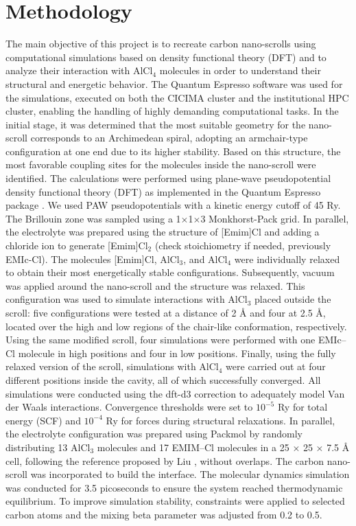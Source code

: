 \documentclass[aps,twocolumn,secnumarabic,nobalancelastpage,amsmath,amssymb,
nofootinbib,floatfix]{revtex4}
\begin{document}
\section{Methodology}
The main objective of this project is to recreate carbon nano-scrolls using computational simulations based on density functional theory (DFT) and to analyze their interaction with AlCl$_4$ molecules in order to understand their structural and energetic behavior. The Quantum Espresso software was used for the simulations, executed on both the CICIMA cluster and the institutional HPC cluster, enabling the handling of highly demanding computational tasks.
In the initial stage, it was determined that the most suitable geometry for the nano-scroll corresponds to an Archimedean spiral, adopting an armchair-type configuration at one end due to its higher stability. Based on this structure, the most favorable coupling sites for the molecules inside the nano-scroll were identified. The calculations were performed using plane-wave pseudopotential density functional theory (DFT) as implemented in the Quantum Espresso package \cite{qe}. We used PAW pseudopotentials with a kinetic energy cutoff of 45 Ry. The Brillouin zone was sampled using a 1$\times$1$\times$3 Monkhorst-Pack grid.
In parallel, the electrolyte was prepared using the structure of [Emim]Cl and adding a chloride ion to generate [Emim]Cl$_2$ (check stoichiometry if needed, previously EMIc-Cl). The molecules [Emim]Cl, AlCl$_3$, and AlCl$_4$ were individually relaxed to obtain their most energetically stable configurations.
Subsequently, vacuum was applied around the nano-scroll and the structure was relaxed. This configuration was used to simulate interactions with AlCl$_3$ placed outside the scroll: five configurations were tested at a distance of 2 Å and four at 2.5 Å, located over the high and low regions of the chair-like conformation, respectively. Using the same modified scroll, four simulations were performed with one EMIc–Cl molecule in high positions and four in low positions. Finally, using the fully relaxed version of the scroll, simulations with AlCl$_4$ were carried out at four different positions inside the cavity, all of which successfully converged.
All simulations were conducted using the dft-d3 correction to adequately model Van der Waals interactions. Convergence thresholds were set to $10^{-5}$ Ry for total energy (SCF) and $10^{-4}$ Ry for forces during structural relaxations.
In parallel, the electrolyte configuration was prepared using Packmol by randomly distributing 13 AlCl$_3$ molecules and 17 EMIM–Cl molecules in a 25 × 25 × 7.5 Å cell, following the reference proposed by Liu\cite{liu2018carbon} , without overlaps. The carbon nano-scroll was incorporated to build the interface. The molecular dynamics simulation was conducted for 3.5 picoseconds to ensure the system reached thermodynamic equilibrium. To improve simulation stability, constraints were applied to selected carbon atoms and the mixing beta parameter was adjusted from 0.2 to 0.5.
\end{document}
